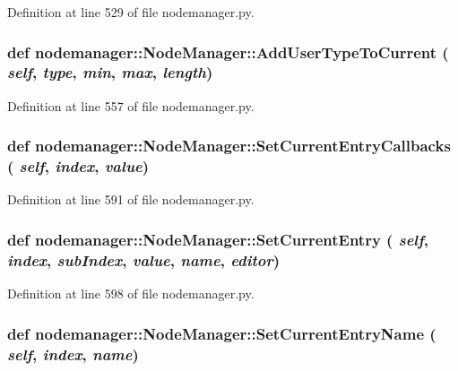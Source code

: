 Definition at line 529 of file nodemanager.py.\hypertarget{classnodemanager_1_1NodeManager_67c9ed379da322dc8db21b56395d6799}{
\subsubsection[AddUserTypeToCurrent]{\setlength{\rightskip}{0pt plus 5cm}def nodemanager::Node\-Manager::Add\-User\-Type\-To\-Current ( {\em self},  {\em type},  {\em min},  {\em max},  {\em length})}}
\label{classnodemanager_1_1NodeManager_67c9ed379da322dc8db21b56395d6799}




Definition at line 557 of file nodemanager.py.\hypertarget{classnodemanager_1_1NodeManager_dad0fbfe17b585712c0336ad71ec55d1}{
\subsubsection[SetCurrentEntryCallbacks]{\setlength{\rightskip}{0pt plus 5cm}def nodemanager::Node\-Manager::Set\-Current\-Entry\-Callbacks ( {\em self},  {\em index},  {\em value})}}
\label{classnodemanager_1_1NodeManager_dad0fbfe17b585712c0336ad71ec55d1}




Definition at line 591 of file nodemanager.py.\hypertarget{classnodemanager_1_1NodeManager_7e9f5eccab23a7d2f7f7cb6f3e8fc92f}{
\subsubsection[SetCurrentEntry]{\setlength{\rightskip}{0pt plus 5cm}def nodemanager::Node\-Manager::Set\-Current\-Entry ( {\em self},  {\em index},  {\em sub\-Index},  {\em value},  {\em name},  {\em editor})}}
\label{classnodemanager_1_1NodeManager_7e9f5eccab23a7d2f7f7cb6f3e8fc92f}




Definition at line 598 of file nodemanager.py.\hypertarget{classnodemanager_1_1NodeManager_d0de3995c628b62448fe144651c019bb}{
\subsubsection[SetCurrentEntryName]{\setlength{\rightskip}{0pt plus 5cm}def nodemanager::Node\-Manager::Set\-Current\-Entry\-Name ( {\em self},  {\em index},  {\em name})}}
\label{classnodemanager_1_1NodeManager_d0de3995c628b62448fe144651c019bb}




